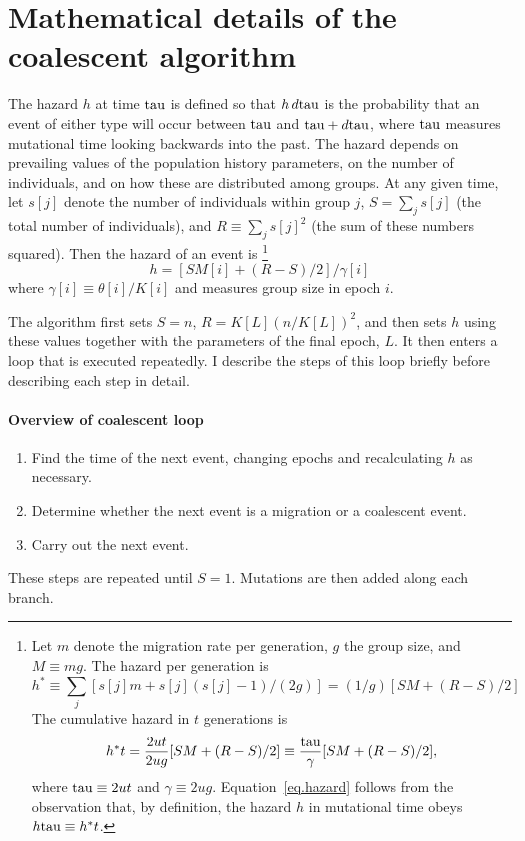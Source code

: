 \section{Mathematical details of the coalescent
algorithm\label{sec.coales.math}} 

The hazard $h$ at time $\hbox{tau}$ is defined so that $h\, d\hbox{tau}$ is the
probability that an event of either type will occur between $\hbox{tau}$ and
$\hbox{tau}+d\hbox{tau}$, where $\hbox{tau}$ measures mutational time looking backwards
into the past.  The hazard depends on prevailing values of the
population history parameters, on the number of individuals, and on
how these are distributed among groups.  At any given time, let $s[j]$
denote the number of individuals within group $j$, $S = \sum_j s[j]$
(the total number of individuals), and $R\equiv \sum_j s[j]^2$ (the sum
of these numbers squared).  Then the hazard of an event
is%
\footnote{Let $m$ denote the migration rate per generation, $g$
the group size, and $M \equiv m g$.  The hazard per
generation is
\begin{displaymath}
h^* \equiv\sum_j [s[j] m + s[j](s[j]-1)/(2g)]
= (1/g)[ S M + (R-S)/2]
\end{displaymath}
The cumulative hazard in $t$ generations is 
\begin{displaymath}
h^*t = \frac{2ut}{2ug}[S M + (R-S)/2] 
\equiv \frac{\hbox{tau}}{\gamma}[S M + (R-S)/2], 
\end{displaymath}
where $\hbox{tau}\equiv 2ut$ and $\gamma \equiv 2ug$.
Equation~\ref{eq.hazard} follows from the observation that, by
definition, the hazard $h$ in mutational time obeys $h\hbox{tau} \equiv h^*
t$.}
\begin{equation}
\label{eq.hazard}
h = [S M[i] + (R - S)/2]/\gamma[i]
\end{equation}
where $\gamma[i] \equiv \theta[i]/K[i]$ and measures group size in epoch
$i$.

The algorithm first sets $S=n$, $R = K[L] (n/K[L])^2$, and then sets $h$
using these values together with the parameters of the final epoch,
$L$.  It then enters a loop that is executed repeatedly.  I describe
the steps of this loop briefly before describing each step in detail.

\paragraph{Overview of coalescent loop}
\begin{enumerate}
  \item \label{step.time} Find the time of the next event,
        changing epochs and recalculating $h$ as necessary. 
  \item \label{step.classify} Determine whether the next event is a
        migration or a coalescent event.
  \item \label{step.event} Carry out the next event.
\end{enumerate}
These steps are repeated until $S=1$.  Mutations are then added along
each branch.

